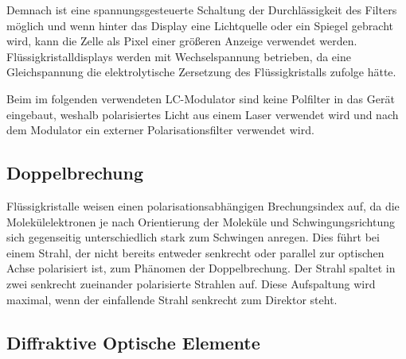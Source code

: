 \documentclass[
	a4paper,
	12pt,
	pagesize,
	ngerman
]{scrartcl}
\begin{document}
	Demnach ist eine spannungsgesteuerte Schaltung der Durchlässigkeit des Filters möglich und wenn hinter das Display eine Lichtquelle oder ein Spiegel gebracht wird, kann die Zelle als Pixel einer größeren Anzeige verwendet werden.
	Flüssigkristalldisplays werden mit Wechselspannung betrieben, da eine Gleichspannung die elektrolytische Zersetzung des Flüssigkristalls zufolge hätte. %

	Beim im folgenden verwendeten LC-Modulator sind keine Polfilter in das Gerät eingebaut, weshalb polarisiertes Licht aus einem Laser verwendet wird und nach dem Modulator ein externer Polarisationsfilter verwendet wird.

\subsection{Doppelbrechung}

	Flüssigkristalle weisen einen polarisationsabhängigen Brechungsindex auf, da die Molekülelektronen je nach Orientierung der Moleküle und Schwingungsrichtung sich gegenseitig unterschiedlich stark zum Schwingen anregen.
	Dies führt bei einem Strahl, der nicht bereits entweder senkrecht oder parallel zur optischen Achse polarisiert ist, zum Phänomen der Doppelbrechung.
	Der Strahl spaltet in zwei senkrecht zueinander polarisierte Strahlen auf.
	Diese Aufspaltung wird maximal, wenn der einfallende Strahl senkrecht zum Direktor steht.


	\subsection{Diffraktive Optische Elemente} %
\end{document}

